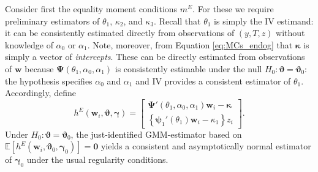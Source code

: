 Consider first the equality moment conditions $m^E$.
For these we require preliminary estimators of $\theta_1$, $\kappa_2$, and $\kappa_3$.
Recall that $\theta_1$ is simply the IV estimand: it can be consistently estimated directly from observations of $(y,T,z)$ without knowledge of $\alpha_0$ or $\alpha_1$.
Note, moreover, from Equation \ref{eq:MCs_endog} that $\boldsymbol{\kappa}$ is simply a vector of \emph{intercepts}.
These can be directly estimated from observations of $\mathbf{w}$ because $\boldsymbol{\Psi}(\theta_1, \alpha_0, \alpha_1)$ is consistently estimable under the null $H_0\colon \boldsymbol{\vartheta} = \boldsymbol{\vartheta}_0$: the hypothesis specifies $\alpha_0$ and $\alpha_1$ and IV provides a consistent estimator of $\theta_1$.
Accordingly, define 
\begin{equation}
  h^E(\mathbf{w}_i, \boldsymbol{\vartheta}, \boldsymbol{\gamma})  =  \left[
 \begin{array}{l}
   \boldsymbol{\Psi}'(\theta_1, \alpha_0, \alpha_1) \mathbf{w}_i - \boldsymbol{\kappa}\\
   \left\{\boldsymbol{\psi}_1'(\theta_1)\mathbf{w}_i - \kappa_1\right\}z_i
 \end{array}
 \right].
\end{equation}
Under $H_0\colon \boldsymbol{\vartheta} = \boldsymbol{\vartheta}_0$, the  just-identified GMM-estimator based on $\mathbb{E}[h^E(\mathbf{w}_i, \boldsymbol{\vartheta}_0, \boldsymbol{\gamma}_0)] = \mathbf{0}$ yields a consistent and asymptotically normal estimator of $\boldsymbol{\gamma}_0$ under the usual regularity conditions.

